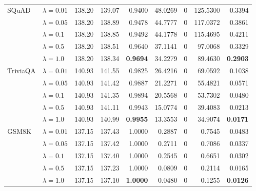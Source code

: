 \begin{table}[t]
{\begin{tabular}{l l rrrrrrr}
\midrule
SQuAD & $\lambda{=}0.01$ & 138.20 & 139.07 & \cellcolor{red!18} 0.9400 & \cellcolor{red!18} 48.0269 & \cellcolor{cyan!12} $0$ & \cellcolor{red!18} 125.5300 & \cellcolor{red!18} 0.3394 \\
 & $\lambda{=}0.05$ & 138.20 & 138.89 & \cellcolor{red!18} 0.9478 & \cellcolor{red!18} 44.7777 & \cellcolor{cyan!12} $0$ & \cellcolor{red!18} 117.0372 & \cellcolor{red!18} 0.3861 \\
 & $\lambda{=}0.1$ & 138.20 & 138.85 & \cellcolor{red!18} 0.9492 & \cellcolor{red!18} 44.1778 & \cellcolor{cyan!12} $0$ & \cellcolor{red!18} 115.4695 & \cellcolor{red!18} 0.4211 \\
 & $\lambda{=}0.5$ & 138.20 & 138.51 & 0.9640 & 37.1141 & \cellcolor{cyan!12} $0$ & 97.0068 & 0.3329 \\
 & $\lambda{=}1.0$ & 138.20 & 138.34 & \textbf{0.9694} & 34.2279 & \cellcolor{cyan!12} $0$ & 89.4630 & \textbf{0.2903} \\
\midrule
TriviaQA & $\lambda{=}0.01$ & 140.93 & 141.55 & 0.9825 & 26.4216 & \cellcolor{cyan!12} $0$ & 69.0592 & 0.1038 \\
 & $\lambda{=}0.05$ & 140.93 & 141.42 & 0.9887 & 21.2271 & \cellcolor{cyan!12} $0$ & 55.4821 & 0.0571 \\
 & $\lambda{=}0.1$ & 140.93 & 141.35 & 0.9894 & 20.5568 & \cellcolor{cyan!12} $0$ & 53.7302 & 0.0480 \\
 & $\lambda{=}0.5$ & 140.93 & 141.11 & 0.9943 & 15.0774 & \cellcolor{cyan!12} $0$ & 39.4083 & 0.0213 \\
 & $\lambda{=}1.0$ & 140.93 & 140.99 & \textbf{0.9955} & 13.3553 & \cellcolor{cyan!12} $0$ & 34.9074 & \textbf{0.0171} \\
\midrule
GSM8K & $\lambda{=}0.01$ & 137.15 & 137.43 & 1.0000 & 0.2887 & \cellcolor{cyan!12} $0$ & 0.7545 & 0.0483 \\
 & $\lambda{=}0.05$ & 137.15 & 137.42 & 1.0000 & 0.2711 & \cellcolor{cyan!12} $0$ & 0.7086 & 0.0337 \\
 & $\lambda{=}0.1$ & 137.15 & 137.40 & 1.0000 & 0.2545 & \cellcolor{cyan!12} $0$ & 0.6651 & 0.0302 \\
 & $\lambda{=}0.5$ & 137.15 & 137.23 & 1.0000 & 0.0809 & \cellcolor{cyan!12} $0$ & 0.2114 & 0.0165 \\
 & $\lambda{=}1.0$ & 137.15 & 137.10 & \textbf{1.0000} & 0.0480 & \cellcolor{cyan!12} $0$ & 0.1255 & \textbf{0.0126} \\
\bottomrule
\end{tabular}}
\end{table}